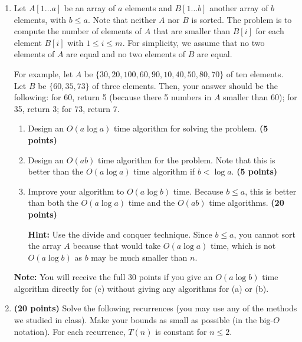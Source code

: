 \documentclass[11pt]{article}
\begin{document}
\begin{enumerate}
\begin{enumerate}
\begin{description}
\end{description}

\end{enumerate}

\item %

Let $A[1\ldots a]$ be an array of $a$ elements and $B[1\ldots b]$ another array of $b$ elements, with $b\leq a$. Note that neither $A$ nor $B$ is sorted. The problem is to compute the number of elements of $A$ that are smaller than $B[i]$ for each element $B[i]$ with $1\leq i\leq m$.
For simplicity, we assume that no two elements of $A$ are equal and no two elements of $B$ are equal.

For example, let $A$ be $\{30, 20, 100, 60, 90, 10, 40, 50, 80, 70\}$ of ten elements. Let $B$ be $\{60, 35, 73\}$ of three elements. Then, your answer should be the following: for 60, return 5 (because there 5 numbers in $A$ smaller than 60); for 35, return 3; for 73, return 7.

\begin{enumerate}
\item
Design an $O(a\log a)$ time algorithm for solving the problem. {\hfill \bf (5 points)}

\item
Design an $O(ab)$ time algorithm for the problem. Note that this is better than the $O(a\log a)$ time algorithm if $b<\log a$. {\hfill \bf (5 points)}

\item
Improve your algorithm to $O(a\log b)$ time. Because $b\leq a$, this is better than both the $O(a\log a)$ time and the $O(ab)$ time algorithms. {\hfill \bf (20 points)}


{\bf Hint:} Use the divide and conquer technique. Since $b\leq a$, you cannot sort the array $A$ because that would take $O(a\log a)$ time, which is not $O(a\log b)$ as $b$ may be much smaller than $n$.
\end{enumerate}


{\bf Note:}
You will receive the full 30 points if you give an $O(a\log b)$ time algorithm directly for (c) without giving any algorithms for (a) or (b).


\item %
{\bf (20 points)}
Solve the following recurrences (you may use any of the methods we studied in class). Make your bounds as small as possible (in the big-$O$ notation). For each recurrence, $T(n)$ is constant for $n\leq 2$.

\begin{enumerate}


\end{enumerate}
\end{enumerate}
\end{document}
